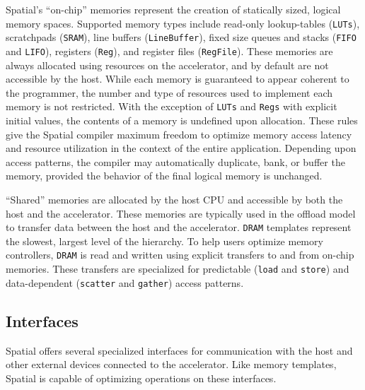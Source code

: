 Spatial's ``on-chip'' memories represent the creation of statically sized, logical memory spaces. 
Supported memory types include read-only lookup-tables (\texttt{\small{LUTs}}), scratchpads (\texttt{\small{SRAM}}), line buffers (\texttt{\small{LineBuffer}}), fixed size queues and stacks (\texttt{\small{FIFO}} and \texttt{\small{LIFO}}),  registers (\texttt{\small{Reg}}), and register files (\texttt{\small{RegFile}}).
These memories are always allocated using resources on the accelerator, and by default are not accessible by the host.
While each memory is guaranteed to appear coherent to the programmer, the number and type of resources used to implement each memory is not restricted.
With the exception of \texttt{\small{LUTs}} and \texttt{\small{Regs}} with explicit initial values, the contents of a memory is undefined upon allocation.
These rules give the Spatial compiler maximum freedom to optimize memory access latency and resource utilization in the context of the entire application. 
Depending upon access patterns, the compiler may automatically duplicate, bank, or buffer the memory, provided the behavior of the final logical memory is unchanged.

``Shared'' memories are allocated by the host CPU and accessible by both the host and the accelerator. 
These memories are typically used in the offload model to transfer data between the host and the accelerator.
\texttt{\small{DRAM}} templates represent the slowest, largest level of the hierarchy. To help users optimize
memory controllers, \texttt{\small{DRAM}} is read and written using explicit transfers to and from on-chip memories. 
These transfers are specialized for predictable (\texttt{\small{load}} and \texttt{\small{store}}) and data-dependent 
(\texttt{\small{scatter}} and \texttt{\small{gather}}) access patterns.  


\subsection{Interfaces}
Spatial offers several specialized interfaces for communication with the host and other external devices connected to the accelerator. Like memory templates, Spatial is capable of optimizing operations on these interfaces.

